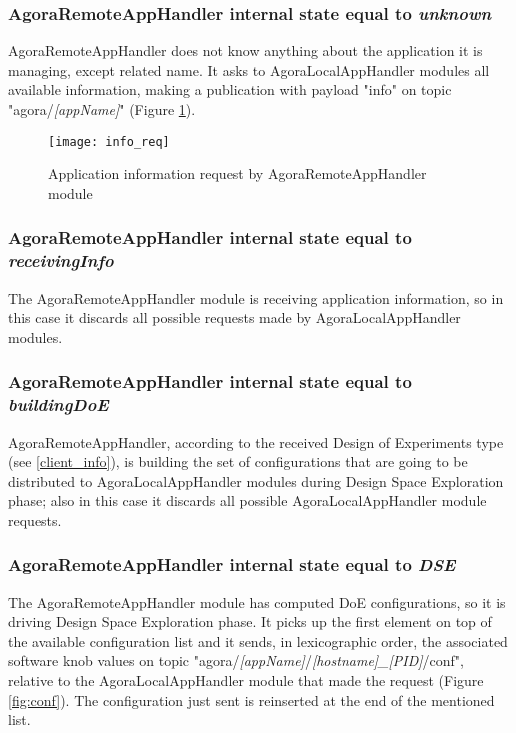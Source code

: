 \subsubsection{AgoraRemoteAppHandler internal state equal to \textit{unknown}}\label{req_info}

AgoraRemoteAppHandler does not know anything about the application it is managing, except related name. It asks to AgoraLocalAppHandler modules all available information, making a publication with payload "info" on topic "agora/\textit{[appName]}" (Figure \ref{fig::remotInfoReq}).

\begin{figure}[ht]

    \centering
    \texttt{[image: info\_req]}
    \caption{Application information request by AgoraRemoteAppHandler module}

    \label{fig::remotInfoReq}
    
\end{figure}


\subsubsection{AgoraRemoteAppHandler internal state equal to \textit{receivingInfo}}

The AgoraRemoteAppHandler module is receiving application information, so in this case it discards all possible requests made by AgoraLocalAppHandler modules.


\subsubsection{AgoraRemoteAppHandler internal state equal to \textit{buildingDoE}}

AgoraRemoteAppHandler, according to the received Design of Experiments type (see \ref{client_info}), is building the set of configurations that are going to be distributed to AgoraLocalAppHandler modules during Design Space Exploration phase; also in this case it discards all possible AgoraLocalAppHandler module requests.


\subsubsection{AgoraRemoteAppHandler internal state equal to \textit{DSE}}\label{dse_conf}

The AgoraRemoteAppHandler module has computed DoE configurations, so it is driving Design Space Exploration phase. It picks up the first element on top of the available configuration list and it sends, in lexicographic order, the associated software knob values on topic "agora\slash{}\textit{[appName]}\slash{}\textit{[hostname]\_[PID]}\slash{}conf", relative to the AgoraLocalAppHandler module that made the request (Figure \ref{fig:conf}). The configuration just sent is reinserted at the end of the mentioned list.

